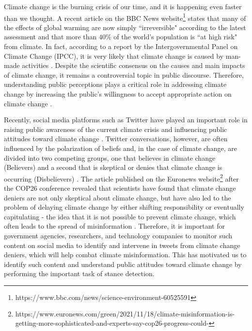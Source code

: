 \documentclass[letterpaper]{article} %
\begin{document}
Climate change is the burning crisis of our time, and it is happening even faster than we thought. A recent article on the BBC News website\footnote{https://www.bbc.com/news/science-environment-60525591} states that many of the effects of global warming are now simply ``irreversible" according to the latest assessment and that more than $40$\% of the world's population is ``at high risk" from climate.
In fact, according to a report by the Intergovernmental Panel on Climate Change (IPCC), it is very likely that climate change is caused by man-made activities \cite{myhre2013climate}. Despite the scientific consensus on the causes and main impacts of climate change, it remains a controversial topic in public discourse. Therefore, understanding public perceptions plays a critical role in addressing climate change by increasing the public's willingness to accept appropriate action on climate change \cite{shi2015public}.
\par\noindent Recently, social media platforms such as Twitter have played an important role in raising public awareness of the current climate crisis and influencing public attitudes toward climate change \cite{lineman2015talking}. Twitter conversations, however, are often influenced by the polarization of beliefs and, in the case of climate change, are divided into two competing groups, one that believes in climate change (Believers) and a second that is skeptical or denies that climate change is occurring (Disbelievers) \cite{jang2015polarized, cann2021ideological}. The article published on the Euronews website\footnote{https://www.euronews.com/green/2021/11/18/climate-misinformation-is-getting-more-sophisticated-and-experts-say-cop26-progress-could-} after the COP26 conference revealed that scientists have found that climate change deniers are not only skeptical about climate change, but have also led to the problem of delaying climate change by either shifting responsibility or eventually capitulating - the idea that it is not possible to prevent climate change, which often leads to the spread of misinformation \cite{zhou2021confirmation}. Therefore, it is important for government agencies, researchers, and technology companies to monitor such content on social media to identify and intervene in tweets from climate change deniers, which will help combat climate misinformation. This has motivated us to identify such content and understand public attitudes toward climate change by performing the important task of stance detection.
\end{document}
